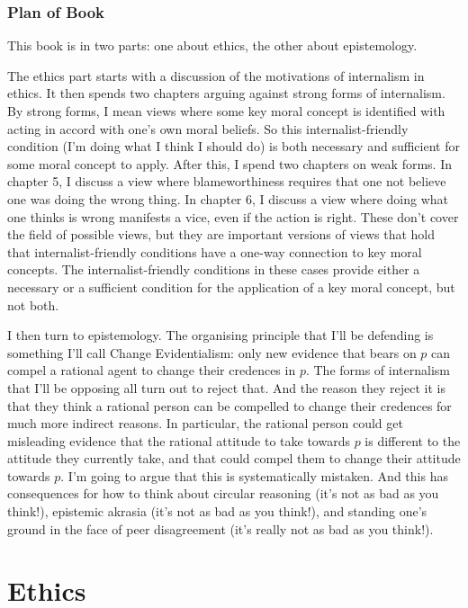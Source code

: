 \section{Plan of Book}
\label{planofbook}

This book is in two parts: one about ethics, the other about epistemology.

The ethics part starts with a discussion of the motivations of internalism in ethics. It then spends two chapters arguing against strong forms of internalism. By strong forms, I mean views where some key moral concept is identified with acting in accord with one's own moral beliefs. So this internalist-friendly condition (I'm doing what I think I should do) is both necessary and sufficient for some moral concept to apply. After this, I spend two chapters on weak forms. In chapter 5, I discuss a view where blameworthiness requires that one not believe one was doing the wrong thing. In chapter 6, I discuss a view where doing what one thinks is wrong manifests a vice, even if the action is right. These don't cover the field of possible views, but they are important versions of views that hold that internalist-friendly conditions have a one-way connection to key moral concepts. The internalist-friendly conditions in these cases provide either a necessary or a sufficient condition for the application of a key moral concept, but not both.

I then turn to epistemology. The organising principle that I'll be defending is something I'll call Change Evidentialism: only new evidence that bears on $p$ can compel a rational agent to change their credences in $p$. The forms of internalism that I'll be opposing all turn out to reject that. And the reason they reject it is that they think a rational person can be compelled to change their credences for much more indirect reasons. In particular, the rational person could get misleading evidence that the rational attitude to take towards $p$ is different to the attitude they currently take, and that could compel them to change their attitude towards $p$. I'm going to argue that this is systematically mistaken. And this has consequences for how to think about circular reasoning (it's not as bad as you think!), epistemic akrasia (it's not as bad as you think!), and standing one's ground in the face of peer disagreement (it's really not as bad as you think!).

\part{Ethics}
\label{ethics}


